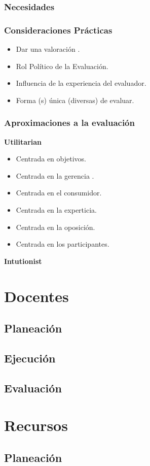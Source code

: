 \documentclass{beamer}
\begin{document}
\begin{frame}
\frametitle{Necesidades}
\end{frame}

\begin{frame}
\frametitle{Consideraciones Pr\'acticas}
\begin{itemize}
\item Dar una valoraci\'on .
\item Rol Pol\'itico de la Evaluaci\'on.
\item Influencia de la experiencia del evaluador. 
\item  Forma (s) \'unica (diversas) de evaluar. 
\end{itemize}
\end{frame}

\begin{frame}
\frametitle{Aproximaciones a la evaluaci\'on}
\textbf{Utilitarian}
\begin{itemize}
\item Centrada en objetivos.
\item Centrada en la gerencia .
\item Centrada en el consumidor.
\item Centrada en la experticia. 
\item Centrada en la oposici\'on.
\item Centrada en los participantes.
\end{itemize}
\textbf{Intutionist}
\end{frame}

\section{Docentes}
\subsection{Planeaci\'on}
\subsection{Ejecuci\'on}
\subsection{Evaluaci\'on}
\section{Recursos}
\subsection{Planeaci\'on}
\end{document}

